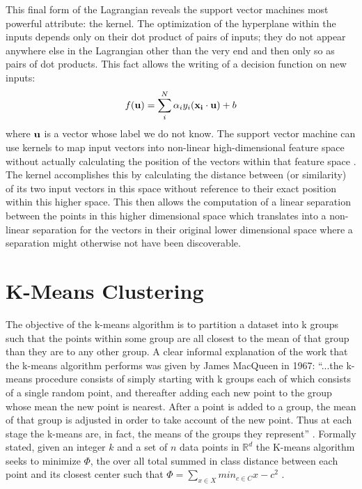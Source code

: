 This final form of the Lagrangian reveals the support vector machines most
powerful attribute: the kernel. The optimization of the hyperplane within the
inputs depends only on their dot product of pairs of inputs; they do not appear
anywhere else in the Lagrangian other than the very end and then only so as
pairs of dot products. This fact allows the writing of a decision function on
new inputs: $$f(\bold{u}) = \sum_{i}^{N}\alpha_{i}y_{i}(\bold{x_i}\cdot\bold{u})+b$$
where $\bold{u}$ is a vector whose label we do not know. The support vector
machine can use kernels to map input vectors into
non-linear high-dimensional feature space without actually calculating the
position of the vectors within that feature space \cite{Vapnik}. The kernel
accomplishes this by calculating the distance between (or similarity) of its two
input vectors in this space without reference to their exact position within
this higher space. This then allows the computation of a linear separation
between the points in this higher dimensional space which translates into a
non-linear separation for the vectors in their original lower dimensional space
where a separation might otherwise not have been discoverable.
\section{K-Means Clustering}
The objective of the k-means algorithm is to partition a dataset into k groups
such that the points within some group are all closest to
the mean of that group than they are to any other group. A clear
informal explanation of the work that the k-means algorithm performs
was given by James MacQueen in 1967: ``...the k-means procedure
consists of simply starting with k groups each of which consists of a
single random point, and thereafter adding each new point to the
group whose mean the new point is nearest. After a point is added to
a group, the mean of that group is adjusted in order to take account
of the new point. Thus at each stage the k-means are, in fact, the
means of the groups they represent'' \cite{MacQueen}. Formally stated,
given an integer $k$ and a set of $n$ data points in
$\mathbb{R}^{d}$ the K-means algorithm seeks to minimize  $\Phi$, the
over all total summed in class distance between each point and its
closest center such that $\mathbb \Phi = \sum_{x \in X} min_{c \in C}{x-c^{2}}$
\cite{Arthur}.

